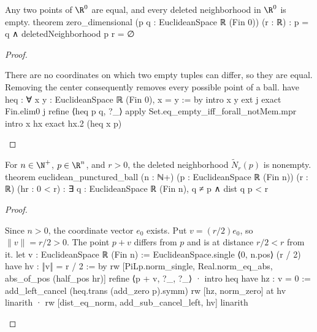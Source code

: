\begin{lemma} \label{an1:lem:zero-dimensional}
  \begin{lean}{Any two points of $\R^{0}$ are equal, and every deleted neighborhood in $\R^{0}$ is empty.}
    theorem zero_dimensional (p q : EuclideanSpace ℝ (Fin 0)) (r : ℝ) :
        p = q ∧ deletedNeighborhood p r = ∅
  \end{lean}
\end{lemma}

\begin{proof}
  \begin{lean}{There are no coordinates on which two empty tuples can differ, so they are equal. Removing the center consequently removes every possible point of a ball.}
    have heq : ∀ x y : EuclideanSpace ℝ (Fin 0), x = y := by
      intro x y
      ext j
      exact Fin.elim0 j
    refine ⟨heq p q, ?_⟩
    apply Set.eq_empty_iff_forall_notMem.mpr
    intro x hx
    exact hx.2 (heq x p)
  \end{lean}

\end{proof}

\begin{lemma} \label{an1:lem:deleted-neighborhood-in-Rn-is-non-empty}
  \begin{lean}{For $n\in\N^{+}$, $p\in\R^{n}$, and $r>0$, the deleted neighborhood $\widetilde N_r(p)$ is nonempty.}
    theorem euclidean_punctured_ball (n : ℕ+)
        (p : EuclideanSpace ℝ (Fin n)) (r : ℝ) (hr : 0 < r) :
        ∃ q : EuclideanSpace ℝ (Fin n), q ≠ p ∧ dist q p < r
  \end{lean}
\end{lemma}

\begin{proof}
  \begin{lean}{Since $n>0$, the coordinate vector $e_0$ exists. Put $v=(r/2)e_0$, so $\|v\|=r/2>0$. The point $p+v$ differs from $p$ and is at distance $r/2<r$ from it.}
    let v : EuclideanSpace ℝ (Fin n) := EuclideanSpace.single ⟨0, n.pos⟩ (r / 2)
    have hv : ‖v‖ = r / 2 := by
      rw [PiLp.norm_single, Real.norm_eq_abs, abs_of_pos (half_pos hr)]
    refine ⟨p + v, ?_, ?_⟩
    · intro heq
      have hz : v = 0 := add_left_cancel (heq.trans (add_zero p).symm)
      rw [hz, norm_zero] at hv
      linarith
    · rw [dist_eq_norm, add_sub_cancel_left, hv]
      linarith
  \end{lean}

\end{proof}

